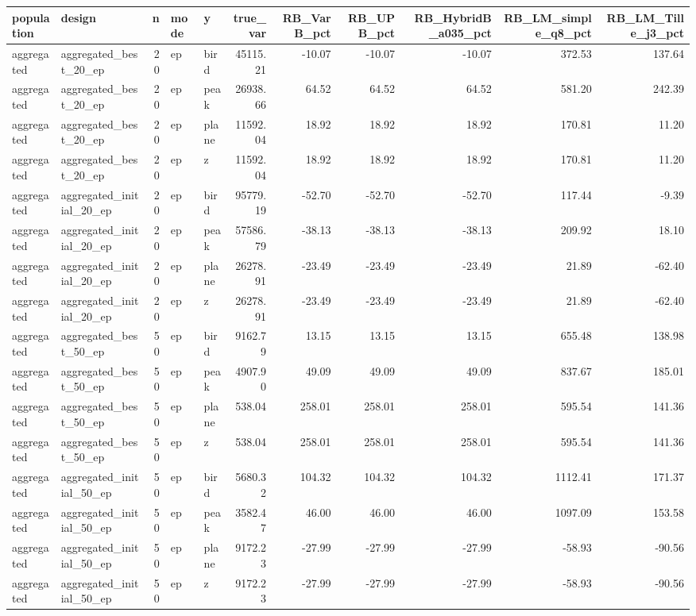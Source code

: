     \begin{tabular}{llrllrrrrrr}
    \toprule
    population & design & n & mode & y & true_var & RB_VarB_pct & RB_UPB_pct & RB_HybridB_a035_pct & RB_LM_simple_q8_pct & RB_LM_Tille_j3_pct \\
    \midrule
    aggregated & aggregated_best_20_ep & 20 & ep & bird & 45115.21 & -10.07 & -10.07 & -10.07 & 372.53 & 137.64 \\
    aggregated & aggregated_best_20_ep & 20 & ep & peak & 26938.66 & 64.52 & 64.52 & 64.52 & 581.20 & 242.39 \\
    aggregated & aggregated_best_20_ep & 20 & ep & plane & 11592.04 & 18.92 & 18.92 & 18.92 & 170.81 & 11.20 \\
    aggregated & aggregated_best_20_ep & 20 & ep & z & 11592.04 & 18.92 & 18.92 & 18.92 & 170.81 & 11.20 \\
    aggregated & aggregated_initial_20_ep & 20 & ep & bird & 95779.19 & -52.70 & -52.70 & -52.70 & 117.44 & -9.39 \\
    aggregated & aggregated_initial_20_ep & 20 & ep & peak & 57586.79 & -38.13 & -38.13 & -38.13 & 209.92 & 18.10 \\
    aggregated & aggregated_initial_20_ep & 20 & ep & plane & 26278.91 & -23.49 & -23.49 & -23.49 & 21.89 & -62.40 \\
    aggregated & aggregated_initial_20_ep & 20 & ep & z & 26278.91 & -23.49 & -23.49 & -23.49 & 21.89 & -62.40 \\
    aggregated & aggregated_best_50_ep & 50 & ep & bird & 9162.79 & 13.15 & 13.15 & 13.15 & 655.48 & 138.98 \\
    aggregated & aggregated_best_50_ep & 50 & ep & peak & 4907.90 & 49.09 & 49.09 & 49.09 & 837.67 & 185.01 \\
    aggregated & aggregated_best_50_ep & 50 & ep & plane & 538.04 & 258.01 & 258.01 & 258.01 & 595.54 & 141.36 \\
    aggregated & aggregated_best_50_ep & 50 & ep & z & 538.04 & 258.01 & 258.01 & 258.01 & 595.54 & 141.36 \\
    aggregated & aggregated_initial_50_ep & 50 & ep & bird & 5680.32 & 104.32 & 104.32 & 104.32 & 1112.41 & 171.37 \\
    aggregated & aggregated_initial_50_ep & 50 & ep & peak & 3582.47 & 46.00 & 46.00 & 46.00 & 1097.09 & 153.58 \\
    aggregated & aggregated_initial_50_ep & 50 & ep & plane & 9172.23 & -27.99 & -27.99 & -27.99 & -58.93 & -90.56 \\
    aggregated & aggregated_initial_50_ep & 50 & ep & z & 9172.23 & -27.99 & -27.99 & -27.99 & -58.93 & -90.56 \\

\end{tabular}
